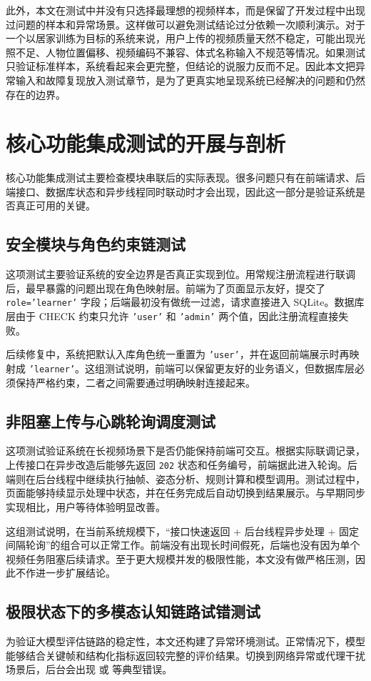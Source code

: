 \documentclass[UTF8,twoside]{ctexrep}
\makeatletter
\def@NAT@last@yr{\@citea}%
\def@NAT@last@yr{-\NAT@penalty}%
\makeatother
\begin{document}
此外，本文在测试中并没有只选择最理想的视频样本，而是保留了开发过程中出现过问题的样本和异常场景。这样做可以避免测试结论过分依赖一次顺利演示。对于一个以居家训练为目标的系统来说，用户上传的视频质量天然不稳定，可能出现光照不足、人物位置偏移、视频编码不兼容、体式名称输入不规范等情况。如果测试只验证标准样本，系统看起来会更完整，但结论的说服力反而不足。因此本文把异常输入和故障复现放入测试章节，是为了更真实地呈现系统已经解决的问题和仍然存在的边界。

\section{核心功能集成测试的开展与剖析}

核心功能集成测试主要检查模块串联后的实际表现。很多问题只有在前端请求、后端接口、数据库状态和异步线程同时联动时才会出现，因此这一部分是验证系统是否真正可用的关键。

\subsection{安全模块与角色约束链测试}
这项测试主要验证系统的安全边界是否真正实现到位。用常规注册流程进行联调后，最早暴露的问题出现在角色映射层。前端为了页面显示友好，提交了 \texttt{role='learner'} 字段；后端最初没有做统一过滤，请求直接进入 SQLite。数据库层由于 CHECK 约束只允许 \texttt{'user'} 和 \texttt{'admin'} 两个值，因此注册流程直接失败。

后续修复中，系统把默认入库角色统一重置为 \texttt{'user'}，并在返回前端展示时再映射成 \texttt{'learner'}。这组测试说明，前端可以保留更友好的业务语义，但数据库层必须保持严格约束，二者之间需要通过明确映射连接起来。

\subsection{非阻塞上传与心跳轮询调度测试}
这项测试验证系统在长视频场景下是否仍能保持前端可交互。根据实际联调记录，上传接口在异步改造后能够先返回 \texttt{202} 状态和任务编号，前端据此进入轮询。后端则在后台线程中继续执行抽帧、姿态分析、规则计算和模型调用。测试过程中，页面能够持续显示处理中状态，并在任务完成后自动切换到结果展示。与早期同步实现相比，用户等待体验明显改善。

这组测试说明，在当前系统规模下，“接口快速返回 + 后台线程异步处理 + 固定间隔轮询”的组合可以正常工作。前端没有出现长时间假死，后端也没有因为单个视频任务阻塞后续请求。至于更大规模并发的极限性能，本文没有做严格压测，因此不作进一步扩展结论。

\subsection{极限状态下的多模态认知链路试错测试}
为验证大模型评估链路的稳定性，本文还构建了异常环境测试。正常情况下，模型能够结合关键帧和结构化指标返回较完整的评价结果。切换到网络异常或代理干扰场景后，后台会出现  或  等典型错误。
\end{document}
